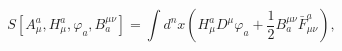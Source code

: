 \begin{equation}
S\left[ A_{\mu }^{a},H_{\mu }^{a},\varphi _{a},B_{a}^{\mu \nu }\right] =\int
d^{n}x\left( H_{\mu }^{a}D^{\mu }\varphi _{a}+\frac{1}{2}B_{a}^{\mu \nu }%
\bar{F}_{\mu \nu }^{a}\right) ,  \label{i40}
\end{equation}

